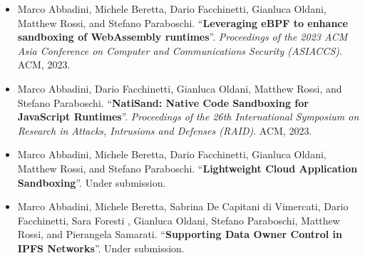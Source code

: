 \begin{itemize}
    \nocite{enhance-wasm-sandbox}
    \item Marco Abbadini, Michele Beretta, Dario Facchinetti, Gianluca
        Oldani, Matthew Rossi, and Stefano Paraboschi.
        ``\textbf{Leveraging eBPF to enhance sandboxing of
        WebAssembly runtimes}''. {\em Proceedings of the 2023 ACM Asia
        Conference on Computer and Communications Security (ASIACCS)}.
        ACM, 2023.
    
    \nocite{natisand}
    \item Marco Abbadini, Dario Facchinetti, Gianluca Oldani, Matthew
        Rossi, and Stefano Paraboschi. ``\textbf{NatiSand: Native Code
        Sandboxing for JavaScript Runtimes}''. {\em Proceedings of the
        26th International Symposium on Research in Attacks,
        Intrusions and Defenses (RAID)}. ACM, 2023.

    \nocite{dmng}
    \item Marco Abbadini, Michele Beretta, Dario Facchinetti, Gianluca
        Oldani, Matthew Rossi, and Stefano Paraboschi.
        ``\textbf{Lightweight Cloud Application Sandboxing}''. Under
        submission.

    \nocite{freya-ipfs}
    \item Marco Abbadini, Michele Beretta, Sabrina De Capitani di
        Vimercati, Dario Facchinetti, Sara Foresti , Gianluca Oldani,
        Stefano Paraboschi, Matthew Rossi, and Pierangela Samarati.
        ``\textbf{Supporting Data Owner Control in IPFS Networks}''.
        Under submission.
\end{itemize}
